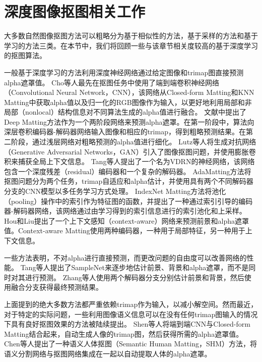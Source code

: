 \section{深度图像抠图相关工作}
大多数自然图像抠图方法可以粗略分为基于相似性的方法\cite{levin2008closed,he2010fast,lee2011nonlocal,chen2013knn,aksoy2017designing}，基于采样的方法\cite{wang2007optimized,gastal2010shared,he2011global,feng2016cluster}和基于学习的方法\cite{xu2017deep,lutz2018alphagan,lu2019indices,samplenet,hou2019context,cai2019disentangled}三类。在本节中，我们将回顾一些与该章节相关度较高的基于深度学习的抠图算法。

一般基于深度学习的方法利用深度神经网络通过给定图像和trimap图直接预测alpha遮罩值。
Cho等人\cite{cho2019deep}最先在抠图任务中使用了端到端卷积神经网络（Convolutional Neural Network，CNN），该网络从Closed-form Matting\cite{levin2008closed}和KNN Matting\cite{chen2013knn}中获取alpha值以及归一化的RGB图像作为输入，以更好地利用局部和非局部（nonlocal）结构信息对不同算法生成的alpha值进行融合。
文献\parencite{xu2017deep}中提出了Deep Matting方法作为一个两阶段网络来预测alpha遮罩。在第一阶段中，算法向深层卷积编码器-解码器网络输入图像和相应的trimap，得到粗略预测结果。在第二阶段，通过浅层网络对粗略预测的alpha值进行细化。
Lutz等人\cite{lutz2018alphagan}将生成对抗网络（Generative Adversarial Networks，GAN）引入了图像抠图问题，并使用膨胀卷积来捕获全局上下文信息。
Tang等人\cite{tang2019very}提出了一个名为VDRN的神经网络，该网络包含一个深度残差（residual）编码器和一个复杂的解码器。
AdaMatting\cite{cai2019disentangled}方法将抠图问题分为两个任务，trimap自适应和alpha估计，并使用具有两个不同解码器分支的CNN模型以多任务学习方式处理。
IndexNet Matting\cite{lu2019indices}方法将池化（pooling）操作中的索引作为特征图的函数，并提出了一种通过索引引导的编码器-解码器网络，该网络通过由学习得到的索引信息进行的索引池化和上采样。
Hou和Liu\cite{hou2019context}提出了一个上下文感知（context-aware）网络来预测前景和alpha遮罩值。Context-aware Matting使用两种编码器，一种用于局部特征，另一种用于上下文信息。 

一些方法表明，不对alpha进行直接预测，而更改问题的自由度可以改善网络的性能。
Tang等人\cite{samplenet}提出了SampleNet来逐步地估计前景、背景和alpha遮罩，而不是同时对其进行预测。
Zhang等人\cite{Zhang2019ALF}使用两个解码器分支分别估计前景和背景，然后使用融合分支获得最终预测结果。

上面提到的绝大多数方法都严重依赖trimap作为输入，以减小解空间。然而最近，对于特定的实际问题，一些利用图像语义信息可以在没有任何trimap图输入的情况下具有良好抠图效果的方法被陆续提出。
Shen等人\cite{shen2016deep}将端到端CNN与Closed-form Matting\cite{levin2008closed}结合起来，自动生成人像的trimap图，然后获得所需的alpha遮罩值。
Chen等人\cite{chen2018semantic}提出了一种语义人体抠图（Semantic Human Matting，SHM）方法，将语义分割网络与抠图网络集成在一起以自动提取人体的alpha遮罩。

